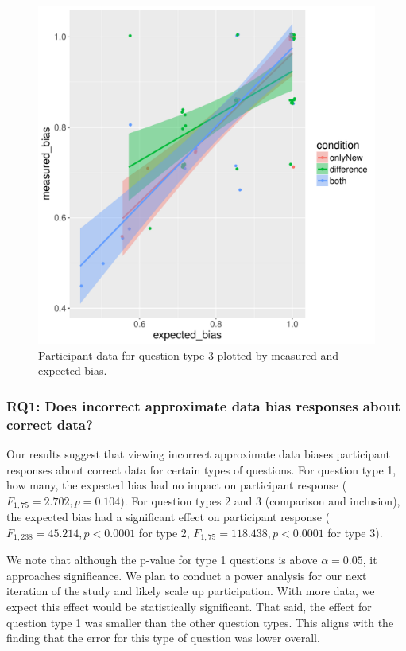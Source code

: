 \documentclass[10pt,journal,compsoc]{IEEEtran}
\begin{document}
\begin{figure}[!t]
  \centering
  \includegraphics[width=\columnwidth]{jaccard_precise_jitter.pdf}
  \caption{Participant data for question type 3 plotted by measured and expected bias.}
  \label{figure_q3}
\end{figure}

\subsubsection{RQ1: Does incorrect approximate data bias responses about correct data?}

Our results suggest that viewing incorrect approximate data biases participant responses about correct data for certain types of questions.
For question type 1, how many, the expected bias had no impact on participant response ($F_{1, 75}=2.702, p=0.104$).
For question types 2 and 3 (comparison and inclusion), the expected bias had a significant effect on participant response ($F_{1, 238}=45.214, p<0.0001$ for type 2, $F_{1, 75}=118.438, p<0.0001$ for type 3).

We note that although the p-value for type 1 questions is above $\alpha=0.05$, it approaches significance.
We plan to conduct a power analysis for our next iteration of the study and likely scale up participation.
With more data, we expect this effect would be statistically significant.
That said, the effect for question type 1 was smaller than the other question types.
This aligns with the finding that the error for this type of question was lower overall.
\end{document}
